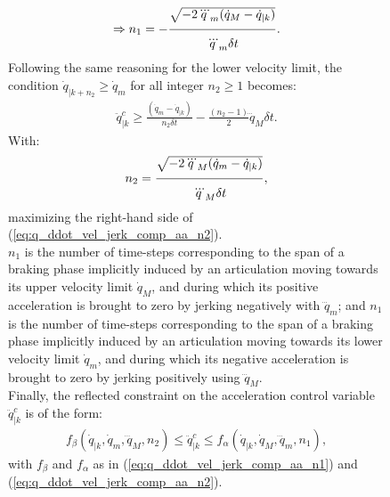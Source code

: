 \begin{figure}[!htbp]
\begin{equation}
\Rightarrow n_1=-\myfrac[5pt]{\sqrt{-2\dddot{q}_m(\dot{q}_M-\dot{q}_{|k})}}{\dddot{q}_m \delta t}.
\label{eq:n_1_eq_aa}
\end{equation}
Following the same reasoning for the lower velocity limit, the condition $\dot{q}_{|k+n_2} \geq \dot{q}_{m}$ for all integer $n_2 \geq 1$ becomes: 
\begin{equation}
\begin{split}
\ddot{q}_{|k}^{c} \geq \frac{(\dot{q}_m-\dot{q}_{|k})}{n_2 \delta t} - \frac{(n_2-1)}{2} \dddot{q}_M \delta t.
\label{eq:q_ddot_vel_jerk_comp_aa_n2}
\end{split}
\end{equation}
With:
\begin{equation}
n_2 = \myfrac[5pt]{\sqrt{-2\dddot{q}_M(\dot{q}_m-\dot{q}_{|k})}}{\dddot{q}_M \delta t}, 
\label{eq:n_2_eq_aa}
\end{equation}
maximizing the right-hand side of (\ref{eq:q_ddot_vel_jerk_comp_aa_n2}). \\
$n_1$ is the number of time-steps corresponding to the span of a braking phase implicitly induced by an articulation moving towards its upper velocity limit $\dot{q}_{M}$, and during which its positive acceleration is brought to zero by jerking negatively with $\dddot{q}_m$; and $n_1$ is the number of time-steps corresponding to the span of a braking phase implicitly induced by an articulation moving towards its lower velocity limit $\dot{q}_{m}$, and during which its negative acceleration is brought to zero by jerking positively using $\dddot{q}_M$.\\
Finally, the reflected constraint on the acceleration control variable $\ddot{q}_{|k}^{c}$ is of the form: 
\begin{equation}
\begin{split}
f_{\beta}(\dot{q}_{|k}, \dot{q}_m, \dddot{q}_M, n_2) \leq \ddot{q}_{|k}^{c} \leq f_{\alpha}(\dot{q}_{|k}, \dot{q}_M, \dddot{q}_m, n_1), 
\label{eq:qddot_cond_to_satisfy_Jerk_Vel_compatibility_profile}
\end{split}
\end{equation}
with $f_{\beta}$ and $f_{\alpha}$ as in (\ref{eq:q_ddot_vel_jerk_comp_aa_n1}) and (\ref{eq:q_ddot_vel_jerk_comp_aa_n2}).

\end{figure}
